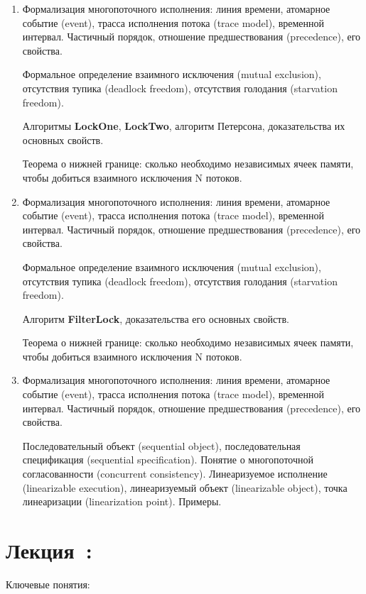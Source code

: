 \documentclass[a4paper, 12pt]{extarticle}
\newcommand{\foundationBasics}{Формализация многопоточного исполнения: линия времени, атомарное событие (event), трасса исполнения потока (trace model), временной интервал. Частичный порядок, отношение предшествования (precedence), его свойства.}
\newcommand{\foundationMutex}{Формальное определение взаимного исключения (mutual exclusion), отсутствия тупика (deadlock freedom), отсутствия голодания (starvation freedom). }
\begin{document}
\begin{enumerate}[\thesection .1]

	\item \foundationBasics

	\foundationMutex

	Алгоритмы \textbf{LockOne}, \textbf{LockTwo}, алгоритм Петерсона, доказательства их основных свойств.
	
	Теорема о нижней границе: сколько необходимо независимых ячеек памяти, чтобы добиться взаимного исключения N потоков.
	
	\item \foundationBasics

	\foundationMutex

	Алгоритм \textbf{FilterLock}, доказательства его основных свойств.

	Теорема о нижней границе: сколько необходимо независимых ячеек памяти, чтобы добиться взаимного исключения N потоков.

	\item \foundationBasics

	Последовательный объект (sequential object), последовательная спецификация (sequential specification).
	Понятие о многопоточной согласованности (concurrent consistency).
	Линеаризуемое исполнение (linearizable execution), линеаризуемый объект (linearizable object), точка линеаризации (linearization point). Примеры.

\end{enumerate}


\section{Лекция~\foundationsPlusNum: \foundationsPlusTopic}

Ключевые понятия: \foundationsPlusKey
\end{document}

